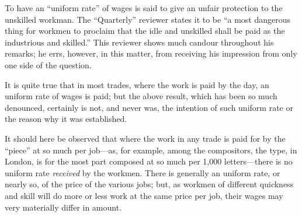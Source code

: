 To have an ``uniform rate'' of wages is said to give an unfair
protection to the unskilled workman. The ``Quarterly'' reviewer states
it to be ``a most dangerous thing for workmen to proclaim that the idle
and unskilled shall be paid as the industrious and skilled.'' This
reviewer shows much candour throughout his remarks; he errs, however, in
this matter, from receiving his impression from only one side of the
question.

It is quite true that in most trades, where the work is paid by the day,
an uniform rate of wages is paid; but the above result, which has been
so much denounced, certainly is not, and never was, the intention of
such uniform rate or the reason why it was established.

It should here be observed that where the work in any trade is paid for
by the ``piece'' at so much per job---as, for example, among the
compositors, the type, in London, is for the most part composed at so
much per 1,000 letters---there is no uniform rate \textit{received} by
the workmen. There is generally an uniform rate, or nearly so, of the
price of the various jobs; but, as workmen of different quickness and
skill will do more or less work at the same price per job, their wages
may very materially differ in amount.

